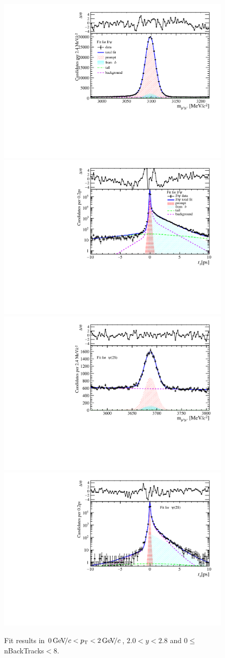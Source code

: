 \begin{figure}[H]
\begin{center}
\includegraphics[width=0.47\linewidth]{pdf/Jpsi/drawmassB/n1y1pt1.pdf}
\includegraphics[width=0.47\linewidth]{pdf/Jpsi/2DFitB/n1y1pt1.pdf}
\vspace*{-0.5cm}
\includegraphics[width=0.47\linewidth]{pdf/Psi2S/drawmassB/n1y1pt1.pdf}
\includegraphics[width=0.47\linewidth]{pdf/Psi2S/2DFitB/n1y1pt1.pdf}
\vspace*{-0.5cm}
\end{center}
\caption{Fit results in $0\text{\,Ge\kern -0.1em V\!/}c<p_{\mathrm{T}}<2\text{\,Ge\kern -0.1em V\!/}c$, $2.0<y<2.8$ and 0$\leq$nBackTracks$<$8.}
\label{Fitn1y1pt1}
\end{figure}
